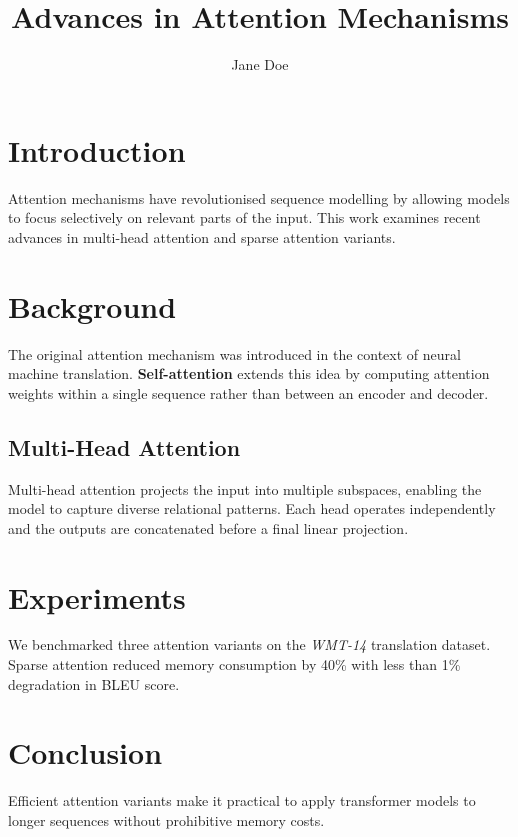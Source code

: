 \documentclass{article}
\title{Advances in Attention Mechanisms}
\author{Jane Doe}
\begin{document}
\maketitle

\section{Introduction}
Attention mechanisms have revolutionised sequence modelling by allowing models
to focus selectively on relevant parts of the input. This work examines recent
advances in multi-head attention and sparse attention variants.

\section{Background}
The original attention mechanism was introduced in the context of neural machine
translation. \textbf{Self-attention} extends this idea by computing attention
weights within a single sequence rather than between an encoder and decoder.

\subsection{Multi-Head Attention}
Multi-head attention projects the input into multiple subspaces, enabling the
model to capture diverse relational patterns. Each head operates independently
and the outputs are concatenated before a final linear projection.

\section{Experiments}
We benchmarked three attention variants on the \textit{WMT-14} translation
dataset. Sparse attention reduced memory consumption by 40\% with less than
1\% degradation in BLEU score.

\section{Conclusion}
Efficient attention variants make it practical to apply transformer models
to longer sequences without prohibitive memory costs.
\end{document}
